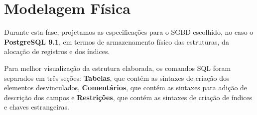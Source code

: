 \documentclass[graduacao,brazil]{ThesisPUC}
\begin{document}

\section{Modelagem F\'{i}sica}

Durante esta fase, projetamos as especificações para o SGBD escolhido, no caso o \textbf{PostgreSQL 9.1},
em termos de armazenamento físico das estruturas, da alocação de registros e dos índices.

Para melhor visualiza\c{c}\~{a}o da estrutura elaborada, os comandos SQL foram separados em tr\^{e}s
se\c{c}\~{o}es: \textbf{Tabelas}, que cont\'{e}m as sintaxes de cria\c{c}\~{a}o dos elementos desvinculados,
\textbf{Coment\'{a}rios}, que cont\'{e}m as sintaxes para adi\c{c}\~{a}o de descri\c{c}\~{a}o dos campos e
\textbf{Restri\c{c}\~{o}es}, que cont\'{e}m as sintaxes de cria\c{c}\~{a}o de \'{i}ndices e chaves
estrangeiras.

\end{document}
